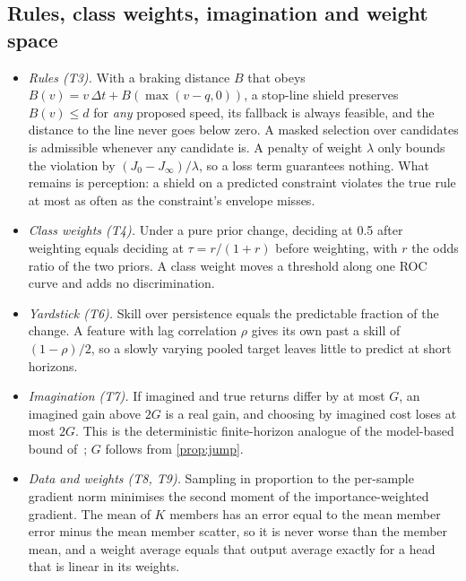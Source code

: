 \documentclass[10pt,twocolumn]{article}
\theoremstyle{remark}
\begin{document}
\subsection{Rules, class weights, imagination and weight space}
\begin{itemize}
  \item \emph{Rules (T3).} With a braking distance $B$ that obeys $B(v)=v\,\Delta t+B(\max(v-q,0))$, a stop-line shield preserves
        $B(v)\le d$ for \emph{any} proposed speed, its fallback is always feasible, and the distance to the line never goes below
        zero. A masked selection over candidates is admissible whenever any candidate is. A penalty of weight $\lambda$ only bounds
        the violation by $(J_0-J_\infty)/\lambda$, so a loss term guarantees nothing. What remains is perception: a shield on a
        predicted constraint violates the true rule at most as often as the constraint's envelope misses.
  \item \emph{Class weights (T4).} Under a pure prior change, deciding at 0.5 after weighting equals deciding at
        $\tau=r/(1+r)$ before weighting, with $r$ the odds ratio of the two priors. A class weight moves a threshold along one ROC
        curve and adds no discrimination.
  \item \emph{Yardstick (T6).} Skill over persistence equals the predictable fraction of the change. A feature with lag correlation
        $\rho$ gives its own past a skill of $(1-\rho)/2$, so a slowly varying pooled target leaves little to predict at short
        horizons.
  \item \emph{Imagination (T7).} If imagined and true returns differ by at most $G$, an imagined gain above $2G$ is a real gain, and
        choosing by imagined cost loses at most $2G$. This is the deterministic finite-horizon analogue of the model-based bound
        of~\cite{mbpo}; $G$ follows from \cref{prop:jump}.
  \item \emph{Data and weights (T8, T9).} Sampling in proportion to the per-sample gradient norm minimises the second moment of
        the importance-weighted gradient. The mean of $K$ members has an error equal to the mean member error minus the mean member
        scatter, so it is never worse than the member mean, and a weight average equals that output average exactly for a head that
        is linear in its weights.
\end{itemize}

\end{document}
